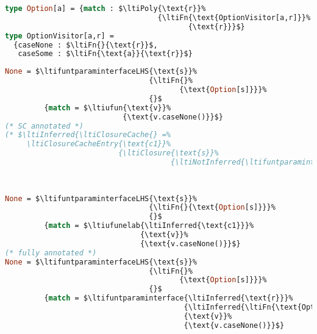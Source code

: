 \newpage

{
\singlespacing
\begin{lstlisting}[language=ml,mathescape=true]
type Option[a] = {match : $\ltiPoly{\text{r}}%
                                   {\ltiFn{\text{OptionVisitor[a,r]}}%
                                          {\text{r}}}$}
type OptionVisitor[a,r] =
  {caseNone : $\ltiFn{}{\text{r}}$,
   caseSome : $\ltiFn{\text{a}}{\text{r}}$}
\end{lstlisting}
}

{
\singlespacing
\begin{lstlisting}[language=ml,mathescape=true]
None = $\ltifuntparaminterfaceLHS{\text{s}}%
                                 {\ltiFn{}%
                                        {\text{Option[s]}}}%
                                 {}$
         {match = $\ltiufun{\text{v}}%
                           {\text{v.caseNone()}}$}
(* SC annotated *)
(* $\ltiInferred{\ltiClosureCache{} =%
     \ltiClosureCacheEntry{\text{c1}}%
                          {\ltiClosure{\text{s}}%
                                      {\ltiNotInferred{\ltifuntparaminterface{\ltiInferred{\text{r}}}%
                                                                             {\ltiInferred{\ltiFn{\text{OptionVisitor[s,r]}}{\text{r}}}}%
                                                                             {\text{v}}%
                                                                             {\text{v.caseNone()}}}}}}$ *)
None = $\ltifuntparaminterfaceLHS{\text{s}}%
                                 {\ltiFn{}{\text{Option[s]}}}%
                                 {}$
         {match = $\ltiufunelab{\ltiInferred{\text{c1}}}%
                               {\text{v}}%
                               {\text{v.caseNone()}}$}
(* fully annotated *)
None = $\ltifuntparaminterfaceLHS{\text{s}}%
                                 {\ltiFn{}%
                                        {\text{Option[s]}}}%
                                 {}$
         {match = $\ltifuntparaminterface{\ltiInferred{\text{r}}}%
                                         {\ltiInferred{\ltiFn{\text{OptionVisitor[s,r]}}{\text{r}}}}%
                                         {\text{v}}%
                                         {\text{v.caseNone()}}$}
\end{lstlisting}
}

